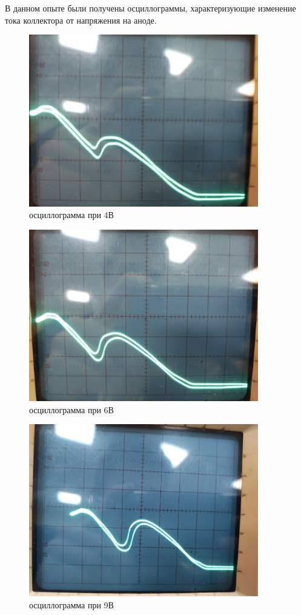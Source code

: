 \documentclass[a4paper,12pt]{article} %
\begin{document}
			В данном опыте были получены осциллограммы, характеризующие изменение тока коллектора от напряжения на аноде.\par
			\begin{figure}[h!]
                \centering
                \includegraphics[width=10cm]{img/din1.jpg}
                \caption{осциллограмма при 4В}
                \label{din1}
            \end{figure}\par
	\newpage
			\begin{figure}[h!]
                \centering
                \includegraphics[width=10cm]{img/din2.jpg}
                \caption{осциллограмма при 6В}
                \label{din2}
            \end{figure}\par
			\begin{figure}[h!]
                \centering
                \includegraphics[width=10cm]{img/din3.jpg}
                \caption{осциллограмма при 9В}
                \label{din3}
            \end{figure}\par
\end{document}
